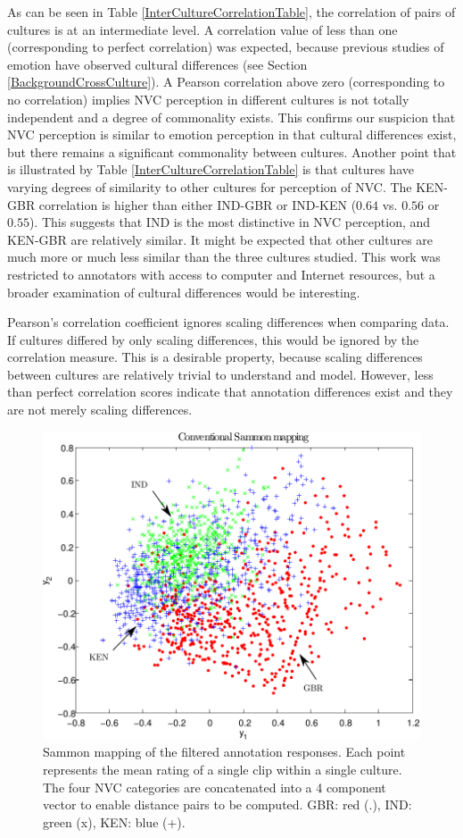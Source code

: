 As can be seen in Table \ref{InterCultureCorrelationTable}, the correlation of pairs of cultures is at an intermediate level. A correlation value of less than one (corresponding to perfect correlation) was expected, because previous studies of emotion have observed cultural differences (see Section \ref{BackgroundCrossCulture}). A Pearson correlation above zero (corresponding to no correlation) implies \ac{NVC} perception in different cultures is not totally independent and a degree of commonality exists. This confirms our suspicion that \ac{NVC} perception is similar to emotion perception in that cultural differences exist, but there remains a significant commonality between cultures. Another point that is illustrated by Table \ref{InterCultureCorrelationTable} is that cultures have varying degrees of similarity to other cultures for perception of \ac{NVC}. The KEN-GBR correlation is higher than either IND-GBR or IND-KEN ($0.64$ vs. $0.56$ or $0.55$). This suggests that IND is the most distinctive in \ac{NVC} perception, and KEN-GBR are relatively similar. It might be expected that other cultures are much more or much less similar than the three cultures studied. This work was restricted to annotators with access to computer and Internet resources, but a broader examination of cultural differences would be interesting.

Pearson's correlation coefficient ignores scaling differences when comparing data. If cultures differed by only scaling differences, this would be ignored by the correlation measure. This is a desirable property, because scaling differences between cultures are relatively trivial to understand and model. However, less than perfect correlation scores indicate that annotation differences exist and they are not merely scaling differences.

\begin{figure}
\centering
\includegraphics[width = 0.78 \columnwidth]{annotation/Sammon3Culture.pdf}
\caption[Sammon mapping of the filtered annotation responses.]{Sammon mapping of the filtered annotation responses. Each point represents the mean rating of a single clip within a single culture. The four \ac{NVC} categories are concatenated into a 4 component vector to enable distance pairs to be computed. GBR: red (.), IND: green (x), KEN: blue (+).}
\label{CultureSammonMapping}
\end{figure}

